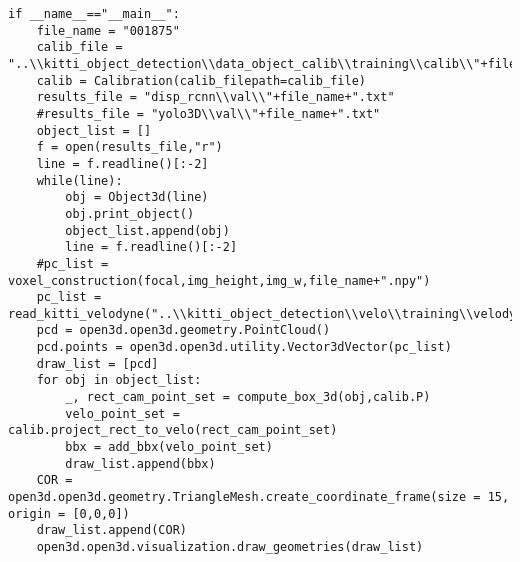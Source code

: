 \begin{lstlisting}
if __name__=="__main__":
    file_name = "001875"
    calib_file = "..\\kitti_object_detection\\data_object_calib\\training\\calib\\"+file_name+".txt"
    calib = Calibration(calib_filepath=calib_file)
    results_file = "disp_rcnn\\val\\"+file_name+".txt"
    #results_file = "yolo3D\\val\\"+file_name+".txt"
    object_list = []
    f = open(results_file,"r")
    line = f.readline()[:-2]
    while(line):
        obj = Object3d(line)
        obj.print_object()
        object_list.append(obj)
        line = f.readline()[:-2]
    #pc_list = voxel_construction(focal,img_height,img_w,file_name+".npy")
    pc_list = read_kitti_velodyne("..\\kitti_object_detection\\velo\\training\\velodyne\\"+file_name+".bin")
    pcd = open3d.open3d.geometry.PointCloud()
    pcd.points = open3d.open3d.utility.Vector3dVector(pc_list)
    draw_list = [pcd]
    for obj in object_list:
        _, rect_cam_point_set = compute_box_3d(obj,calib.P)
        velo_point_set = calib.project_rect_to_velo(rect_cam_point_set)
        bbx = add_bbx(velo_point_set)
        draw_list.append(bbx)
    COR = open3d.open3d.geometry.TriangleMesh.create_coordinate_frame(size = 15, origin = [0,0,0])
    draw_list.append(COR)
    open3d.open3d.visualization.draw_geometries(draw_list)
\end{lstlisting}

